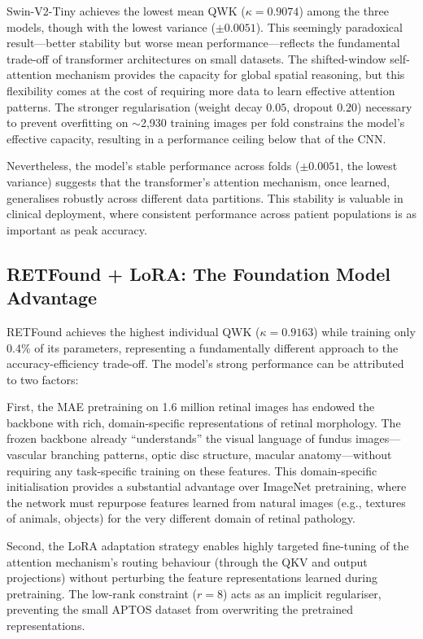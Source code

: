 Swin-V2-Tiny achieves the lowest mean QWK ($\kappa = 0.9074$) among the three models, though with the lowest variance ($\pm 0.0051$). This seemingly paradoxical result---better stability but worse mean performance---reflects the fundamental trade-off of transformer architectures on small datasets. The shifted-window self-attention mechanism provides the capacity for global spatial reasoning, but this flexibility comes at the cost of requiring more data to learn effective attention patterns. The stronger regularisation (weight decay $0.05$, dropout $0.20$) necessary to prevent overfitting on $\sim$2,930 training images per fold constrains the model's effective capacity, resulting in a performance ceiling below that of the CNN.

Nevertheless, the model's stable performance across folds ($\pm 0.0051$, the lowest variance) suggests that the transformer's attention mechanism, once learned, generalises robustly across different data partitions. This stability is valuable in clinical deployment, where consistent performance across patient populations is as important as peak accuracy.

\subsection{RETFound + LoRA: The Foundation Model Advantage}

RETFound achieves the highest individual QWK ($\kappa = 0.9163$) while training only 0.4\% of its parameters, representing a fundamentally different approach to the accuracy-efficiency trade-off. The model's strong performance can be attributed to two factors:

First, the MAE pretraining on 1.6 million retinal images has endowed the backbone with rich, domain-specific representations of retinal morphology. The frozen backbone already ``understands'' the visual language of fundus images---vascular branching patterns, optic disc structure, macular anatomy---without requiring any task-specific training on these features. This domain-specific initialisation provides a substantial advantage over ImageNet pretraining, where the network must repurpose features learned from natural images (e.g., textures of animals, objects) for the very different domain of retinal pathology.

Second, the LoRA adaptation strategy enables highly targeted fine-tuning of the attention mechanism's routing behaviour (through the QKV and output projections) without perturbing the feature representations learned during pretraining. The low-rank constraint ($r = 8$) acts as an implicit regulariser, preventing the small APTOS dataset from overwriting the pretrained representations.

